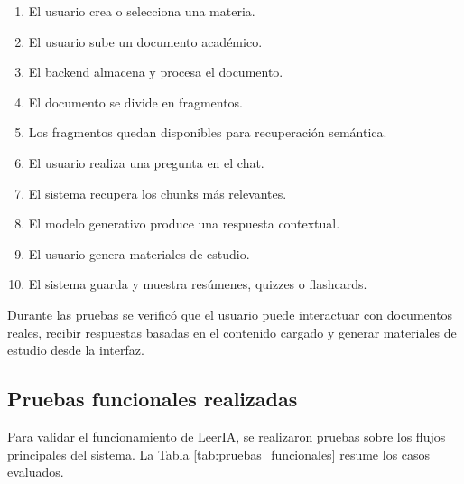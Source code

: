 \documentclass[12pt, letterpaper]{article}
\begin{document}
	\begin{enumerate}
		\item El usuario crea o selecciona una materia.
		\item El usuario sube un documento académico.
		\item El backend almacena y procesa el documento.
		\item El documento se divide en fragmentos.
		\item Los fragmentos quedan disponibles para recuperación semántica.
		\item El usuario realiza una pregunta en el chat.
		\item El sistema recupera los chunks más relevantes.
		\item El modelo generativo produce una respuesta contextual.
		\item El usuario genera materiales de estudio.
		\item El sistema guarda y muestra resúmenes, quizzes o flashcards.
	\end{enumerate}
	
	Durante las pruebas se verificó que el usuario puede interactuar con documentos reales, recibir respuestas basadas en el contenido cargado y generar materiales de estudio desde la interfaz.
	
	\subsection{Pruebas funcionales realizadas}
	
	Para validar el funcionamiento de LeerIA, se realizaron pruebas sobre los flujos principales del sistema. La Tabla \ref{tab:pruebas_funcionales} resume los casos evaluados.
	
\end{document}
